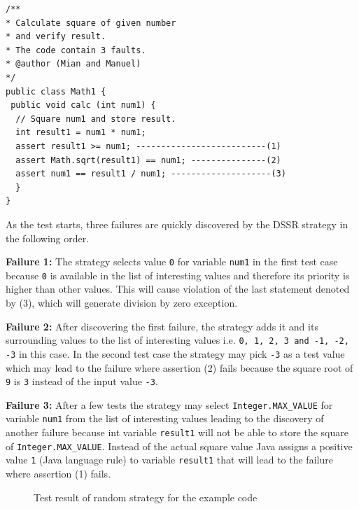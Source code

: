 \bigskip
\begin{lstlisting}
/** 
* Calculate square of given number 
* and verify result. 
* The code contain 3 faults.
* @author (Mian and Manuel)
*/
public class Math1 {
 public void calc (int num1) {
  // Square num1 and store result. 
  int result1 = num1 * num1; 
  assert result1 >= num1; --------------------------(1)
  assert Math.sqrt(result1) == num1; ---------------(2)
  assert num1 == result1 / num1; --------------------(3)
  } 
}
\end{lstlisting}
\bigskip

As the test starts, three failures are quickly discovered by the DSSR strategy in the following order.

\indent \textbf{Failure 1:} The strategy selects value \verb+0+ for variable \verb+num1+  in the first test case because \verb+0+ is available in the list of interesting values and therefore its priority is higher than other values. This will cause violation of the last statement denoted by (3), which will generate division by zero exception.

\indent \textbf{Failure 2:} After discovering the first failure, the strategy adds it and its surrounding values to the list of interesting values i.e. \verb+0, 1, 2, 3 and -1, -2, -3+ in this case. In the second test case the strategy may pick \verb+-3+ as a test value which may lead to the failure where assertion (2) fails because the square root of \verb+9+ is \verb+3+ instead of the input value \verb+-3+.

\indent \textbf{Failure 3:} After a few tests the strategy may select \verb+Integer.MAX_VALUE+ for variable \verb+num1+  from the list of interesting values leading to the discovery of another failure because int variable \verb+result1+ will not be able to store the square of \verb+Integer.MAX_VALUE+. Instead of the actual square value Java assigns a positive value \verb+1+ (Java language rule) to variable \verb+result1+ that will lead to the failure where assertion (1) fails.

\bigskip
\begin{figure}[H]
\centering
\setlength{\fboxsep}{0pt}%
\setlength{\fboxrule}{1pt}%
\bigskip
\caption{Test result of random strategy for the example code}
\label{fig:random_result}
\end{figure}


